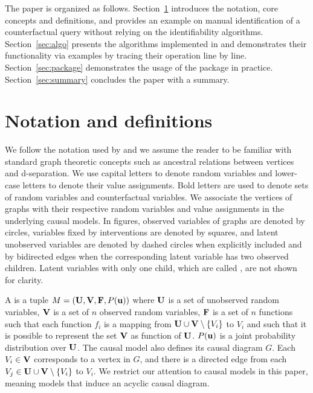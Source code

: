 The paper is organized as follows. Section~\ref{sec:notation} introduces the notation, core concepts and definitions, and provides an example on manual identification of a counterfactual query without relying on the identifiability algorithms. Section~\ref{sec:algo} presents the algorithms implemented in  and demonstrates their functionality via examples by tracing their operation line by line. Section~\ref{sec:package} demonstrates the usage of the  package in practice. Section~\ref{sec:summary} concludes the paper with a summary.


\section{Notation and definitions} \label{sec:notation}

We follow the notation used by \citet{shpitser2008} and we assume the reader to be familiar with standard graph theoretic concepts such as ancestral relations between vertices and d-separation. We use capital letters to denote random variables and lower-case letters to denote their value assignments. Bold letters are used to denote sets of random variables and counterfactual variables. We associate the vertices of graphs with their respective random variables and value assignments in the underlying causal models. In figures, observed variables of graphs are denoted by circles, variables fixed by interventions are denoted by squares, and latent unobserved variables are denoted by dashed circles when explicitly included and by bidirected edges when the corresponding latent variable has two observed children. Latent variables with only one child, which are called , are not shown for clarity. 

A  is a tuple \(M = (\mathbf{U}, \mathbf{V}, \mathbf{F}, P(\mathbf{u}))\) where \(\mathbf{U}\) is a set of unobserved random variables, \(\mathbf{V}\) is a set of \(n\) observed random variables, \(\mathbf{F}\) is a set of \(n\) functions such that each function \(f_i\) is a mapping from \(\mathbf{U} \cup \mathbf{V} \setminus \{V_i\}\) to \(V_i\) and such that it is possible to represent the set \(\mathbf{V}\) as function of \(\mathbf{U}\). \(P(\mathbf{u})\) is a joint probability distribution over \(\mathbf{U}\). The causal model also defines its causal diagram \(G\). Each \(V_i \in \mathbf{V}\) corresponds to a vertex in \(G\), and there is a directed edge from each \(V_j \in \mathbf{U} \cup \mathbf{V} \setminus \{V_i\}\) to \(V_i\). We restrict our attention to  causal models in this paper, meaning models that induce an acyclic causal diagram.

